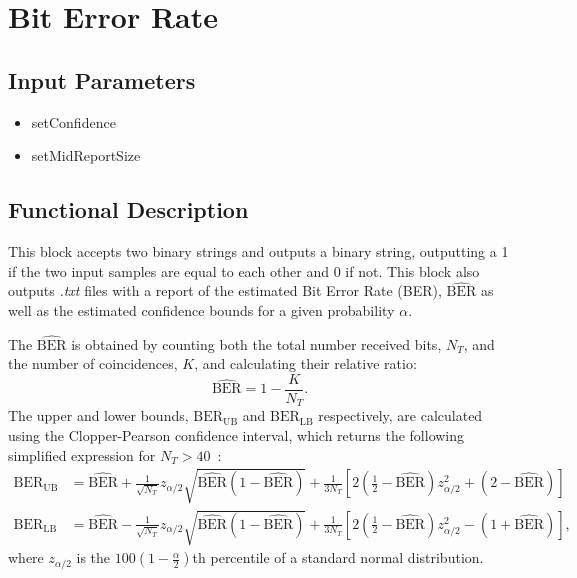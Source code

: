\clearpage

\section{Bit Error Rate}

\subsection*{Input Parameters}

\begin{multicols}{2}
	\begin{itemize}
		\item setConfidence
		\item setMidReportSize
	\end{itemize}
\end{multicols}

\subsection*{Functional Description}\label{bercalc}

This block accepts two binary strings and outputs a binary string, outputting a 1 if the two input samples are equal to each other and 0 if not. This block also outputs \textit{.txt} files with a report of the estimated Bit Error Rate (BER), $\widehat{\text{BER}}$ as well as the estimated confidence bounds for a given probability $\alpha$.
\par
The $\widehat{\text{BER}}$ is obtained by counting both the total number received bits, $N_T$, and the number of coincidences, $K$, and calculating their relative ratio:
\begin{equation}
\widehat{\text{BER}}=1-\frac{K}{N_T}.
\end{equation}
The upper and lower bounds, $\text{BER}_\text{UB}$ and $\text{BER}_\text{LB}$ respectively, are calculated using the Clopper-Pearson confidence interval, which returns the following simplified expression for $N_T>40$~\cite{almeida2016continuous}:
\begin{align}
\text{BER}_\text{UB}&=\widehat{\text{BER}}+\frac{1}{\sqrt{N_T}}z_{\alpha/2}\sqrt{\widehat{\text{BER}}(1-\widehat{\text{BER}})}+\frac{1}{3N_T}\left[2\left(\frac{1}{2}-\widehat{\text{BER}}\right)z_{\alpha/2}^2+(2-\widehat{\text{BER}})\right]\\
\text{BER}_\text{LB}&=\widehat{\text{BER}}-\frac{1}{\sqrt{N_T}}z_{\alpha/2}\sqrt{\widehat{\text{BER}}(1-\widehat{\text{BER}})}+\frac{1}{3N_T}\left[2\left(\frac{1}{2}-\widehat{\text{BER}}\right)z_{\alpha/2}^2-(1+\widehat{\text{BER}})\right],
\end{align}
where $z_{\alpha/2}$ is the $100\left(1-\frac{\alpha}{2}\right)$th percentile of a standard normal distribution.

